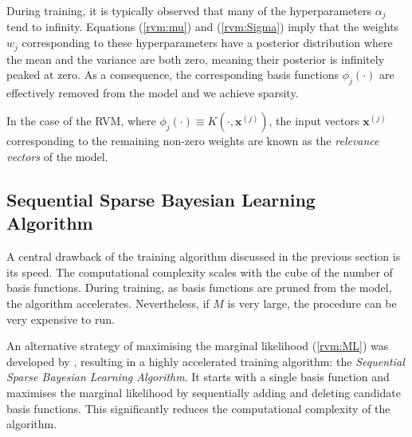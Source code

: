 During training, it is typically observed that many of the hyperparameters $\alpha_j$ tend to infinity.
Equations (\ref{rvm:mu}) and (\ref{rvm:Sigma}) imply that the weights $w_j$ corresponding to these hyperparameters have a posterior distribution where the mean and the variance are both zero, meaning their posterior is infinitely peaked at zero.
As a consequence, the corresponding basis functions $\phi_j(\cdot)$ are effectively removed from the model and we achieve sparsity.

In the case of the RVM, where $\phi_j(\cdot) \equiv K(\cdot, \bm x^{(j)})$, the input vectors $\bm x^{(j)}$ corresponding to the remaining non-zero weights are known as the \emph{relevance vectors} of the model.

\subsection{Sequential Sparse Bayesian Learning Algorithm}
\label{sect:ssbl}
A central drawback of the training algorithm discussed in the previous section is its speed. 
The computational complexity scales with the cube of the number of basis functions.
During training, as basis functions are pruned from the model, the algorithm accelerates.
Nevertheless, if $M$ is very large, the procedure can be very expensive to run.

An alternative strategy of maximising the marginal likelihood (\ref{rvm:ML}) was developed by \cite{tipping2003}, resulting in a highly accelerated training algorithm: the \emph{Sequential Sparse Bayesian Learning Algorithm}.
It starts with a single basis function and maximises the marginal likelihood by sequentially adding and deleting candidate basis functions.
This significantly reduces the computational complexity of the algorithm.

